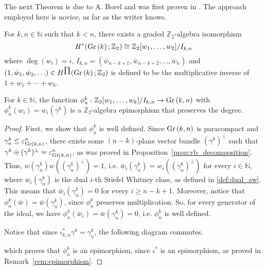 The next Theorem is due to A. Borel and was first proven in \cite{borel}. The approach employed here is novice, as far as the writer knows.
\begin{theorem}\label{thm:cohomology_finite_gr} For $k,n\in\mathbb{N}$ such that $k<n$, there exists a graded $\mathbb{Z}_2$-algebra isomorphism
\[H^*(\Gr{k};\mathbb{Z}_2)\cong\mathbb{Z}_2[w_1,\ldots,w_2]/I_{k,n}\]
where $\deg(w_i)=i$, $I_{k,n}=(\bar{w}_{n-k+1},\bar{w}_{n-k+2},\ldots,\bar{w}_n)$ and $(1,\bar{w}_1,\bar{w}_2,\ldots)\in H^{\prod}(\Gr{k};\mathbb{Z}_2)$ is defined to be the multiplicative inverse of $1+w_1+\cdots+w_k$.
\end{theorem}

\begin{lemma} For $k\in\mathbb{N}$, the function $\phi_n^k:\mathbb{Z}_2[w_1,\ldots,w_k]/I_{k,n}\to\Gr{k}{n}$ with $\phi_n^k(w_i)=w_i(\gamma^k)$ is a $\mathbb{Z}_2$-algebra epimorphism that preserves the degree.
\end{lemma}
\begin{proof} First, we show that $\phi_n^k$ is well defined. Since $\Gr{k}{n}$ is paracompact and $\gamma_n^k\leq\varepsilon_{\Gr{k}{n}}^n$, there exists some $(n-k)$-plane vector bundle $(\gamma^k)^{\perp}$ such that $\gamma^k\oplus(\gamma^k)^{\perp}=\varepsilon_{\Gr{k}{n}}^n$, as was proved in Proposition~\ref{prop:vb_decomposition}. Thus, $w(\gamma_n^k)w((\gamma_n^k)^{\perp})=1$, i.e. $\bar{w}_i(\gamma_n^k)=w_i((\gamma_n^k)^{\perp})$ for every $i\in\mathbb{N}$, where $\bar{w}_i(\gamma_n^k)$ is the dual $i$-th Stiefel Whitney class, as defined in \ref{def:dual_sw}. This means that $\bar{w}_i(\gamma_n^k)=0$ for every $i\geq n-k+1$. Moreover, notice that $\phi_n^k(\bar{w})=\bar{w}(\gamma_n^k)$, since $\phi_n^k$ preserves multiplication. So, for every generator of the ideal, we have $\phi_n^k(\bar{w}_{i})=\bar{w}(\gamma_n^k)=0$, i.e. $\phi_n^k$ is well defined.

Notice that since $\iota_{k,n}^*\gamma^k=\gamma_n^k$, the following diagram commutes.
\begin{center}
\end{center}
which proves that $\phi_n^k$ is an epimorphism, since $\iota^*$ is an epimorphism, as proved in Remark~\ref{rem:epimorphism}.
\end{proof}
